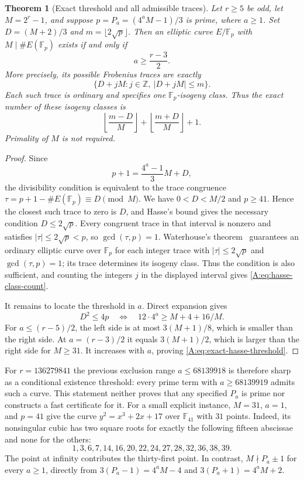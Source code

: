 \documentclass[11pt,a4paper]{article}
\newtheorem{theorem}{Theorem}[section]
\theoremstyle{definition}
\theoremstyle{remark}
\numberwithin{equation}{section}
\begin{document}
\begin{theorem}[Exact threshold and all admissible traces]
\label{A:thm:exact-hasse-threshold}
Let $r\ge5$ be odd, let $M=2^r-1$, and suppose
$p=P_a=(4^aM-1)/3$ is prime, where $a\ge1$.
Set $D=(M+2)/3$ and $m=\lfloor2\sqrt p\rfloor$. Then an elliptic curve
$E/\mathbb F_p$ with $M\mid\#E(\mathbb F_p)$ exists if and only if
\begin{equation}
 a\ge\frac{r-3}{2}.
 \label{A:eq:exact-hasse-threshold}
\end{equation}
More precisely, its possible Frobenius traces are exactly
\[
 \{D+jM:j\in\mathbb Z,\ |D+jM|\le m\}.
\]
Each such trace is ordinary and specifies one $\mathbb F_p$-isogeny class.
Thus the exact number of these isogeny classes is
\begin{equation}
 \left\lfloor\frac{m-D}{M}\right\rfloor
 +\left\lfloor\frac{m+D}{M}\right\rfloor+1.
 \label{A:eq:hasse-class-count}
\end{equation}
Primality of $M$ is not required.
\end{theorem}
\begin{proof}
Since
\[
 p+1=\frac{4^a-1}{3}M+D,
\]
the divisibility condition is equivalent to the trace congruence
$\tau=p+1-\#E(\mathbb F_p)\equiv D\pmod M$.
We have $0<D<M/2$ and $p\ge41$. Hence the closest such trace to zero
is $D$, and Hasse's bound gives the necessary condition $D\le2\sqrt p$.
Every congruent trace in that interval is nonzero and satisfies
$|\tau|\le2\sqrt p<p$, so $\gcd(\tau,p)=1$.
Waterhouse's theorem~\cite[Theorem 4.1]{R018} guarantees an
ordinary elliptic curve over $\mathbb F_p$ for each integer trace
with $|\tau|\le2\sqrt p$ and $\gcd(\tau,p)=1$; its trace determines its
isogeny class. Thus the condition is also sufficient, and counting the
integers $j$ in the displayed interval gives \eqref{A:eq:hasse-class-count}.

It remains to locate the threshold in $a$. Direct expansion gives
\[
 D^2\le4p
 \quad\Longleftrightarrow\quad
 12\cdot4^a\ge M+4+16/M.
\]
For $a\le(r-5)/2$, the left side is at most $3(M+1)/8$, which is
smaller than the right side. At $a=(r-3)/2$ it equals
$3(M+1)/2$, which is larger than the right side for $M\ge31$.
It increases with $a$, proving \eqref{A:eq:exact-hasse-threshold}.
\end{proof}
For $r=136279841$ the previous exclusion range $a\le68139918$ is
therefore sharp as a conditional existence threshold: every prime term
with $a\ge68139919$ admits such a curve. This statement neither proves
that any specified $P_a$ is prime nor constructs a fast certificate for it.
For a small explicit instance, $M=31$, $a=1$, and $p=41$ give the
curve $y^2=x^3+2x+17$ over $\mathbb F_{41}$ with $31$ points.
Indeed, its nonsingular cubic has two square roots for exactly the
following fifteen abscissae and none for the others:
\[
 1,3,6,7,14,16,20,22,24,27,28,32,36,38,39.
\]
The point at infinity contributes the thirty-first point. In contrast,
$M\nmid P_a\pm1$ for every $a\ge1$, directly from
$3(P_a-1)=4^aM-4$ and $3(P_a+1)=4^aM+2$.
\end{document}
